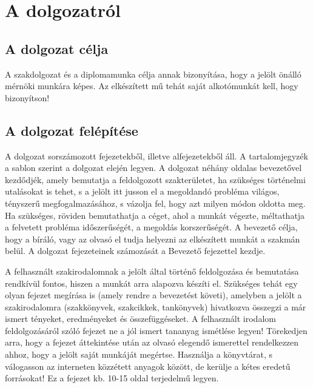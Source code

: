 \chapter{A dolgozatról}

\section{A dolgozat célja}
A szakdolgozat és a diplomamunka célja annak bizonyítása, hogy a jelölt önálló mérnöki munkára képes. Az elkészített mű tehát saját alkotómunkát kell, hogy bizonyítson!

\section{A dolgozat felépítése}
A dolgozat sorszámozott fejezetekből, illetve alfejezetekből áll. A tartalomjegyzék a sablon szerint a dolgozat elején legyen. A dolgozat néhány oldalas bevezetővel kezdődjék, amely bemutatja a feldolgozott szakterületet, ha szükséges történelmi utalásokat is tehet, s a jelölt itt jusson el a megoldandó probléma világos, tényszerű megfogalmazásához, s vázolja fel, hogy azt milyen módon oldotta meg. Ha szükséges, röviden bemutathatja a céget, ahol a munkát végezte, méltathatja a felvetett probléma időszerűségét, a megoldás korszerűségét. A bevezető célja, hogy a bíráló, vagy az olvasó el tudja helyezni az elkészített munkát a szakmán belül. A dolgozat fejezeteinek számozását a Bevezető fejezettel kezdje.

A felhasznált szakirodalomnak a jelölt által történő feldolgozása és bemutatása rendkívül fontos, hiszen a munkát arra alapozva készíti el. Szükséges tehát egy olyan fejezet megírása is (amely rendre a bevezetést követi), amelyben a jelölt a szakirodalomra (szakkönyvek, szakcikkek, tankönyvek) hivatkozva összegzi a már ismert tényeket, eredményeket és összefüggéseket. A felhasznált irodalom feldolgozásáról szóló fejezet ne a jól ismert tananyag ismétlése legyen! Törekedjen arra, hogy a fejezet áttekintése után az olvasó elegendő ismerettel rendelkezzen ahhoz, hogy a jelölt saját munkáját megértse. Használja a könyvtárat, s válogasson az interneten közzétett anyagok között, de kerülje a kétes eredetű forrásokat! Ez a fejezet kb. 10-15 oldal terjedelmű legyen.

